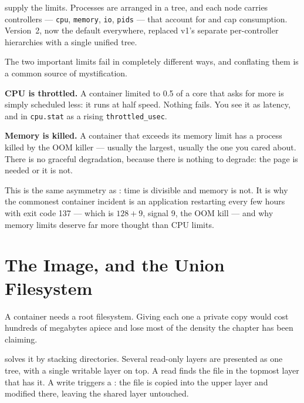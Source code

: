  supply the limits. Processes are arranged in a tree, and
each node carries controllers --- \texttt{cpu}, \texttt{memory}, \texttt{io},
\texttt{pids} --- that account for and cap consumption. Version~2, now the
default everywhere, replaced v1's separate per-controller hierarchies with a
single unified tree.

\begin{conceptbox}
The two important limits fail in completely different ways, and conflating them
is a common source of mystification.

\smallskip
\textbf{CPU is throttled.} A container limited to 0.5 of a core that asks for
more is simply scheduled less: it runs at half speed. Nothing fails. You see it
as latency, and in \texttt{cpu.stat} as a rising \texttt{throttled\_usec}.

\smallskip
\textbf{Memory is killed.} A container that exceeds its memory limit has a
process killed by the OOM killer --- usually the largest, usually the one you
cared about. There is no graceful degradation, because there is nothing to
degrade: the page is needed or it is not.

\smallskip
This is the same asymmetry as : time is divisible and memory is
not. It is why the commonest container incident is an application restarting
every few hours with exit code 137 --- which is $128 + 9$, signal 9, the OOM
kill --- and why memory limits deserve far more thought than CPU limits.
\end{conceptbox}

\section{The Image, and the Union Filesystem}

A container needs a root filesystem. Giving each one a private copy would cost
hundreds of megabytes apiece and lose most of the density the chapter has been
claiming.

 solves it by stacking directories. Several read-only
 layers are presented as one tree, with a single writable
 layer on top. A read finds the file in the topmost layer that has
it. A write triggers a : the file is copied into the upper layer
and modified there, leaving the shared layer untouched.

